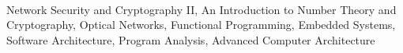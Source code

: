  \hfill \\[-0.2cm]
\hspace*{0.45cm} Network Security and Cryptography II, An Introduction to Number Theory and Cryptography, Optical \hspace*{0.6cm}Networks, Functional Programming, Embedded Systems, Software Architecture, Program Analysis, Advanced \hspace*{0.6cm}Computer Architecture \\[-0.2cm]

